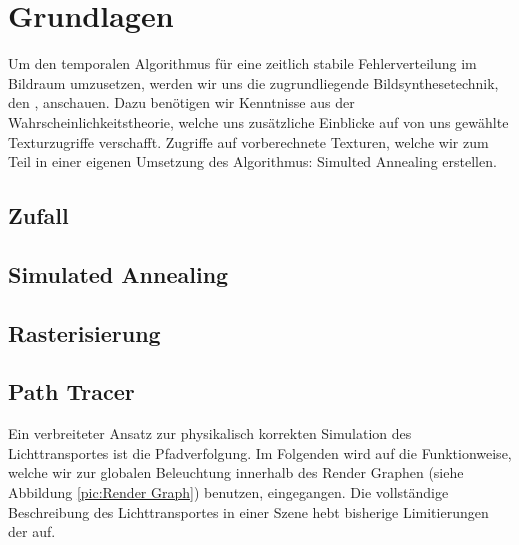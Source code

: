 \vfill
\chapter{Grundlagen}
\label{ch:Grundlagen}
Um den temporalen Algorithmus für eine zeitlich stabile  Fehlerverteilung im Bildraum umzusetzen, werden wir uns 
die zugrundliegende Bildsynthesetechnik, den , anschauen. Dazu benötigen wir Kenntnisse aus der Wahrscheinlichkeitstheorie, welche 
uns zusätzliche Einblicke auf von uns gewählte Texturzugriffe verschafft. Zugriffe auf vorberechnete Texturen, welche wir zum Teil in einer eigenen Umsetzung des
Algorithmus: Simulted Annealing erstellen.


\section{Zufall}
\label{ch:Content1:sec:Zufall}


\newpage
\section{Simulated Annealing}
\label{ch:Content2:sec:Simulated Annealing}


\newpage
\section{Rasterisierung}
\label{ch:Content1:sec:Rasterisierung}



\newpage
\section{Path Tracer}
\label{ch:Content1:sec:Path Tracer}
\vspace*{2cm}
Ein verbreiteter Ansatz zur physikalisch korrekten Simulation des Lichttransportes ist die Pfadverfolgung. Im Folgenden wird auf die Funktionweise, welche wir 
zur globalen Beleuchtung innerhalb des Render Graphen (siehe Abbildung \ref{pic:Render Graph}) benutzen, eingegangen. Die vollständige 
Beschreibung des Lichttransportes in einer Szene hebt bisherige Limitierungen der  auf. 
\par


